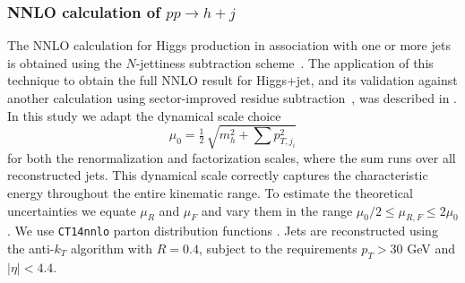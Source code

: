 \subsubsection{NNLO calculation of $pp\to h+j$}
\label{sec:hjetscomp:tools:fo:BFGLP}

The NNLO calculation for Higgs production in association with one or 
more jets is obtained using the $N$-jettiness subtraction 
scheme~\cite{Boughezal:2015dva,Gaunt:2015pea}.  The application of 
this technique to obtain the full NNLO result for Higgs+jet, and its 
validation against another calculation using sector-improved residue 
subtraction~\cite{Boughezal:2015dra}, was described in 
\cite{Boughezal:2015aha}.  In this study we adapt the dynamical scale choice
%
\begin{equation}
  \mu_0 = \tfrac{1}{2}\,\sqrt{m_{h}^2+\sum p_{T,j_i}^2}
\end{equation}
%
for both the renormalization and factorization scales, where the sum 
runs over all reconstructed jets.  This dynamical scale correctly 
captures the characteristic energy throughout the entire kinematic 
range.  To estimate the theoretical uncertainties we equate $\mu_R$ 
and $\mu_F$ and vary them in the range $\mu_0/2 \leq \mu_{R,F} \leq 2 \mu_0$.  
We use \texttt{CT14nnlo} parton distribution functions 
\cite{Dulat:2015mca}.  Jets are reconstructed using the anti-$k_T$ algorithm 
with $R=0.4$, subject to the requirements $p_T>30$ GeV and $|\eta|<4.4$.
